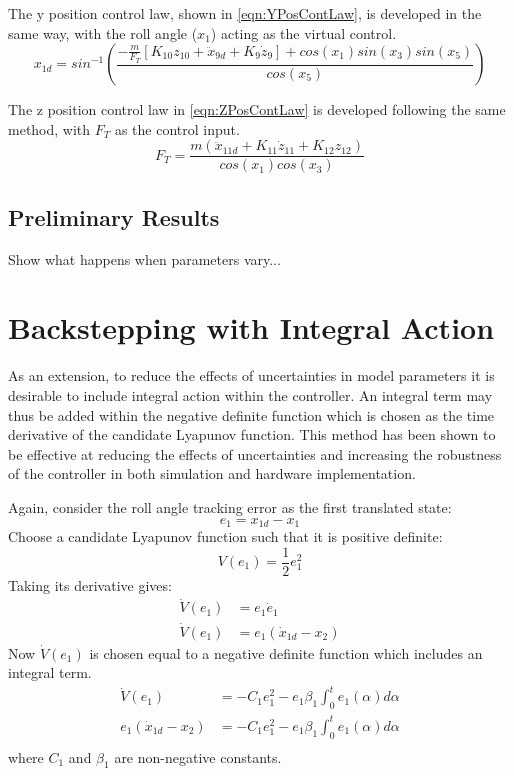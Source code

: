 The y position control law, shown in \eqref{eqn:YPosContLaw}, is developed in the same way, with the roll angle ($x_{1}$) acting as the virtual control. 
\begin{equation}\label{eqn:YPosContLaw}
x_{1d}=sin^{-1}\left(\frac{-\frac{m}{F_{T}}[K_{10}z_{10}+\ddot{x}_{9d}+K_{9}\dot{z}_{9}]+cos(x_{1})sin(x_{3})sin(x_{5})}{cos(x_{5})}\right)
\end{equation}
 
The z position control law in \eqref{eqn:ZPosContLaw} is developed following the same method, with $F_{T}$ as the control input.
\begin{equation}\label{eqn:ZPosContLaw}
F_{T}=\frac{m(\ddot{x}_{11d}+K_{11}\dot{z}_{11}+K_{12}z_{12})}{cos(x_{1})cos(x_{3})}
\end{equation}

\subsection{Preliminary Results}
 Show what happens when parameters vary...

\section{Backstepping with Integral Action}\label{section:IntBack}
As an extension, to reduce the effects of uncertainties in model parameters it is desirable to include integral action within the controller. An integral term may thus be added within the negative definite function which is chosen as the time derivative of the candidate Lyapunov function. This method has been shown to be effective at reducing the effects of uncertainties and increasing the robustness of the controller in both simulation\cite{Jasim2015} and hardware\cite{Bouabdallah2006} implementation.

Again, consider the roll angle tracking error as the first translated state:
\[e_{1}=x_{1d}-x_{1}\]
Choose a candidate Lyapunov function such that it is positive definite:
\[V(e_{1})=\frac{1}{2}e_{1}^{2}\]
Taking its derivative gives:
\begin{equation}
\begin{split}
\dot{V}(e_{1})&=e_{1}\dot{e}_{1}\\
\dot{V}(e_{1})&=e_{1}(\dot{x}_{1d}-x_{2})
\end{split}
\end{equation}
Now $\dot{V}(e_{1})$ is chosen equal to a negative definite function which includes an integral term.
\begin{equation}
\begin{split}
\dot{V}(e_{1})&=-C_{1}e_{1}^{2}-e_{1}\beta_{1}\int^{t}_{0} e_{1}(\alpha) d\alpha\\
e_{1}(\dot{x}_{1d}-x_{2})&=-C_{1}e_{1}^{2}-e_{1}\beta_{1}\int^{t}_{0} e_{1}(\alpha) d\alpha\\
\end{split}
\end{equation}
where $C_{1}$ and $\beta_{1}$ are non-negative constants.

